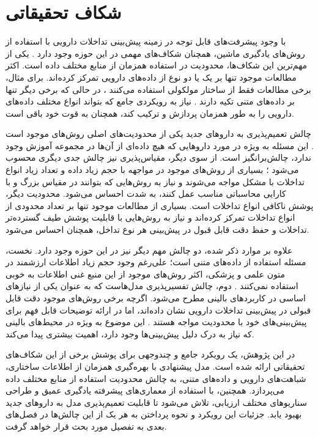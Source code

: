 \section{شکاف تحقیقاتی}

با وجود پیشرفت‌های قابل توجه در زمینه پیش‌بینی تداخلات دارویی با استفاده از روش‌های یادگیری ماشین، همچنان شکاف‌های مهمی در این حوزه وجود دارد \cite{ref_shi2024}. یکی از مهم‌ترین این شکاف‌ها، محدودیت در استفاده همزمان از منابع مختلف داده است. اکثر مطالعات موجود تنها بر یک یا دو نوع از داده‌های دارویی تمرکز کرده‌اند. برای مثال، برخی مطالعات فقط از ساختار مولکولی استفاده می‌کنند \cite{ref_nyamabo2021}، در حالی که برخی دیگر تنها بر داده‌های متنی تکیه دارند \cite{ref_he2023}. نیاز به رویکردی جامع که بتواند انواع مختلف داده‌های دارویی را به طور همزمان پردازش و ترکیب کند، همچنان به قوت خود باقی است.

چالش تعمیم‌پذیری به داروهای جدید یکی از محدودیت‌های اصلی روش‌های موجود است \cite{ref_deng2020}. این مسئله به ویژه در مورد داروهایی که هیچ داده‌ای از آن‌ها در مجموعه آموزش وجود ندارد، چالش‌برانگیز است. از سوی دیگر، مقیاس‌پذیری نیز چالش جدی دیگری محسوب می‌شود \cite{ref_dai2020}؛ بسیاری از روش‌های موجود در مواجهه با حجم زیاد داده و تعداد زیاد انواع تداخلات با مشکل مواجه می‌شوند و نیاز به روش‌هایی که بتوانند در مقیاس بزرگ و با کارایی محاسباتی مناسب عمل کنند، به شدت احساس می‌شود. محدودیت دیگر، پوشش ناکافی انواع تداخلات است. بسیاری از مطالعات موجود تنها بر تعداد محدودی از انواع تداخلات تمرکز کرده‌اند \cite{ref_ryu2018} و نیاز به روش‌هایی با قابلیت پوشش طیف گسترده‌تر تداخلات و حفظ دقت قابل قبول در پیش‌بینی هر نوع تداخل، همچنان احساس می‌شود.

علاوه بر موارد ذکر شده، دو چالش مهم دیگر نیز در این حوزه وجود دارد. نخست، مسئله استفاده از داده‌های متنی است؛ علی‌رغم وجود حجم زیاد اطلاعات ارزشمند در متون علمی و پزشکی، اکثر روش‌های موجود از این منبع غنی اطلاعات به خوبی استفاده نمی‌کنند \cite{ref_he2023}. دوم، چالش تفسیرپذیری مدل‌هاست که به عنوان یکی از نیازهای اساسی در کاربردهای بالینی مطرح می‌شود. اگرچه برخی روش‌های موجود دقت قابل قبولی در پیش‌بینی تداخلات دارویی نشان داده‌اند، اما در ارائه توضیحات قابل فهم برای پیش‌بینی‌های خود با محدودیت مواجه هستند \cite{ref_lin2022}. این موضوع به ویژه در محیط‌های بالینی که نیاز به درک دلیل پیش‌بینی‌ها وجود دارد، اهمیت بیشتری پیدا می‌کند.

در این پژوهش، یک رویکرد جامع و چندوجهی برای پوشش برخی از این شکاف‌های تحقیقاتی ارائه شده است. مدل پیشنهادی با بهره‌گیری همزمان از اطلاعات ساختاری، شباهت‌های دارویی و داده‌های متنی، به چالش محدودیت استفاده از منابع مختلف داده می‌پردازد. همچنین، با استفاده از معماری‌های پیشرفته یادگیری عمیق و طراحی سناریوهای مختلف ارزیابی، تلاش می‌شود تا قابلیت تعمیم‌پذیری مدل به داروهای جدید بهبود یابد. جزئیات این رویکرد و نحوه پرداختن به هر یک از این چالش‌ها در فصل‌های بعدی به تفصیل مورد بحث قرار خواهد گرفت.
